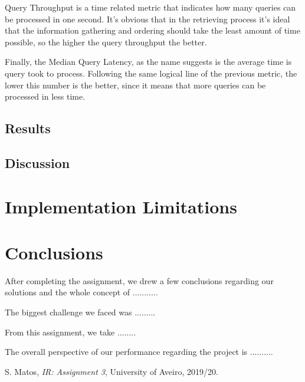 \documentclass[12pt]{article}
\begin{document}
Query Throughput is a time related metric that indicates how many queries can be processed in one second. It's obvious that in the retrieving process it's ideal that the information gathering and ordering should take the least amount of time possible, so the higher the query throughput the better.

Finally, the Median Query Latency, as the name suggests is the average time is query took to process. Following the same logical line of the previous metric, the lower this number is the better, since it means that more queries can be processed in less time.

\subsection{Results}

\subsection{Discussion}

\section{Implementation Limitations}

\section{Conclusions}

After completing the assignment, we drew a few conclusions regarding our
solutions and the whole concept of ...........

The biggest challenge we faced was .........

From this assignment, we take ........

The overall perspective of our performance regarding the project is ..........

\begin{thebibliography}{9}
  

    S. Matos,
    \textit{IR: Assignment 3},
    University of Aveiro,
    2019/20.
  
\end{thebibliography}

\clearpage
\end{document}

